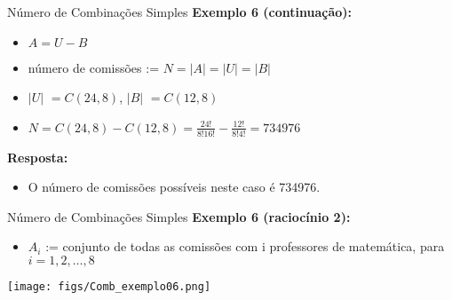 \documentclass[aspectratio=169]{beamer}
\begin{document}
\begin{frame}{Número de Combinações Simples}
    \textbf{Exemplo 6 (continuação):}
    \begin{itemize}
        \item[] $A = U - B$
        \item[] número de comissões := $N = |A| = |U| = |B|$
    \end{itemize}

    \pause
    \vspace{2mm}

    \begin{itemize}
        \item[] $|U|$  \pause $= C(24,8)$, \pause $|B|$ \pause $= C(12,8)$ \pause
        \item[] $N = C(24,8) - C(12,8) = \frac{24!}{8! 16!} - \frac{12!}{8! 4!} = 734976$
    \end{itemize}

    \vspace{2mm}
    \textbf{Resposta:}

    \begin{itemize}
        \item O número de comissões possíveis neste caso é 734976.
    \end{itemize}

\end{frame}

\begin{frame}{Número de Combinações Simples}
    \textbf{Exemplo 6 (raciocínio 2):}
    \begin{itemize}
        \item[] $A_i$ := conjunto de todas as comissões com i professores de matemática, para $i = 1,2,\ldots,8$
    \end{itemize}

    \begin{center}
        \texttt{[image: figs/Comb\_exemplo06.png]}
    \end{center}

\end{frame}
\end{document}
